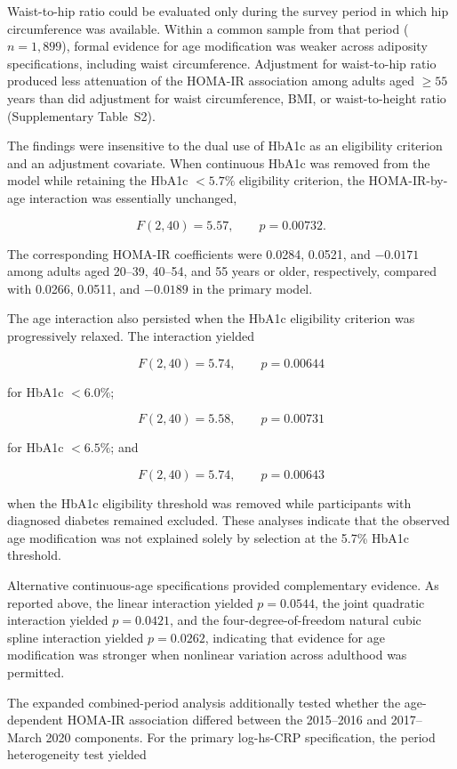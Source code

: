\documentclass[11pt]{article}
\begin{document}
Waist-to-hip ratio could be evaluated only during the survey period in
which hip circumference was available. Within a common sample from that
period ($n=1{,}899$), formal evidence for age modification was weaker
across adiposity specifications, including waist circumference.
Adjustment for waist-to-hip ratio produced less attenuation of the
HOMA-IR association among adults aged $\geq55$ years than did adjustment
for waist circumference, BMI, or waist-to-height ratio
(Supplementary Table~S2).

The findings were insensitive to the dual use of HbA1c as an
eligibility criterion and an adjustment covariate. When continuous
HbA1c was removed from the model while retaining the HbA1c $<5.7\%$
eligibility criterion, the HOMA-IR-by-age interaction was essentially
unchanged,

\[
F(2,40)=5.57,
\qquad
p=0.00732.
\]

The corresponding HOMA-IR coefficients were 0.0284, 0.0521, and
$-0.0171$ among adults aged 20--39, 40--54, and 55 years or older,
respectively, compared with 0.0266, 0.0511, and $-0.0189$ in the
primary model.

The age interaction also persisted when the HbA1c eligibility
criterion was progressively relaxed. The interaction yielded

\[
F(2,40)=5.74,\qquad p=0.00644
\]

for HbA1c $<6.0\%$;

\[
F(2,40)=5.58,\qquad p=0.00731
\]

for HbA1c $<6.5\%$; and

\[
F(2,40)=5.74,\qquad p=0.00643
\]

when the HbA1c eligibility threshold was removed while participants
with diagnosed diabetes remained excluded. These analyses indicate
that the observed age modification was not explained solely by
selection at the 5.7\% HbA1c threshold.

Alternative continuous-age specifications provided complementary
evidence. As reported above, the linear interaction yielded
$p=0.0544$, the joint quadratic interaction yielded $p=0.0421$,
and the four-degree-of-freedom natural cubic spline interaction
yielded $p=0.0262$, indicating that evidence for age modification
was stronger when nonlinear variation across adulthood was permitted.

The expanded combined-period analysis additionally tested whether
the age-dependent HOMA-IR association differed between the
2015--2016 and 2017--March 2020 components. For the primary
log-hs-CRP specification, the period heterogeneity test yielded
\end{document}

